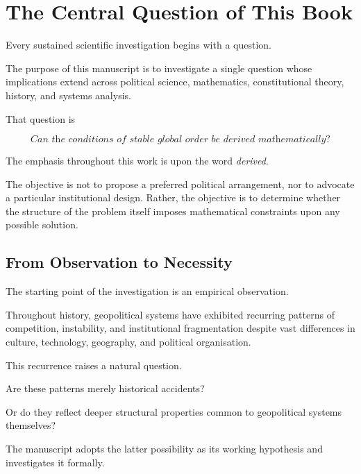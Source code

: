 \documentclass[11pt,openany]{book}
\theoremstyle{plain}
\theoremstyle{definition}
\begin{document}
\chapter*{The Central Question of This Book}


Every sustained scientific investigation begins with a question.

The purpose of this manuscript is to investigate a single question whose implications extend across political science, mathematics, constitutional theory, history, and systems analysis.

That question is

\[
\boxed{
\textit{
Can the conditions of stable global order be derived mathematically?
}
}
\]

The emphasis throughout this work is upon the word \emph{derived}.

The objective is not to propose a preferred political arrangement, nor to advocate a particular institutional design. Rather, the objective is to determine whether the structure of the problem itself imposes mathematical constraints upon any possible solution.


\section*{From Observation to Necessity}

The starting point of the investigation is an empirical observation.

Throughout history, geopolitical systems have exhibited recurring patterns of competition, instability, and institutional fragmentation despite vast differences in culture, technology, geography, and political organisation.

This recurrence raises a natural question.

Are these patterns merely historical accidents?

Or do they reflect deeper structural properties common to geopolitical systems themselves?

The manuscript adopts the latter possibility as its working hypothesis and investigates it formally.

\end{document}
